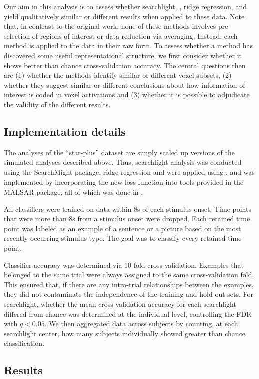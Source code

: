 Our aim in this analysis is to assess whether searchlight, {\lasso}, ridge regression, and {\soslasso} yield qualitatively similar or different results when applied to these data. Note that, in contrast to the original work, none of these methods involves pre-selection of regions of interest or data reduction via averaging. Instead, each method is applied to the data in their raw form. To assess whether a method has discovered some useful representational structure, we first consider whether it shows better than chance cross-validation accuracy. The central questions then are (1) whether the methods identify similar or different voxel subsets, (2) whether they suggest similar or different conclusions about how information of interest is coded in voxel activations and (3) whether it is possible to adjudicate the validity of the different results.

\subsection{Implementation details}
The analyses of the ``star-plus'' dataset are simply scaled up versions of the simulated analyses described above. Thus, searchlight analysis was conducted using the SearchMight package, ridge regression and {\lasso} were applied using {\glmnet}, and {\soslasso} was implemented by incorporating the new loss function into tools provided in the MALSAR package, all of which was done in {\matlab}. 

All classifiers were trained on data within 8s of each stimulus onset. Time points that were more than 8s from a stimulus onset were dropped. Each retained time point was labeled as an example of a sentence or a picture based on the most recently occurring stimulus type. The goal was to classify every retained time point.

Classifier accuracy was determined via 10-fold cross-validation. Examples that belonged to the same trial were always assigned to the same cross-validation fold. This ensured that, if there are any intra-trial relationships between the examples, they did not contaminate the independence of the training and hold-out sets. For searchlight, whether the mean cross-validation accuracy for each searchlight differed from chance was determined at the individual level, controlling the FDR with $q < 0.05$. We then aggregated data across subjects by counting, at each searchlight center, how many subjects individually showed greater than chance classification. 

\subsection{Results}

